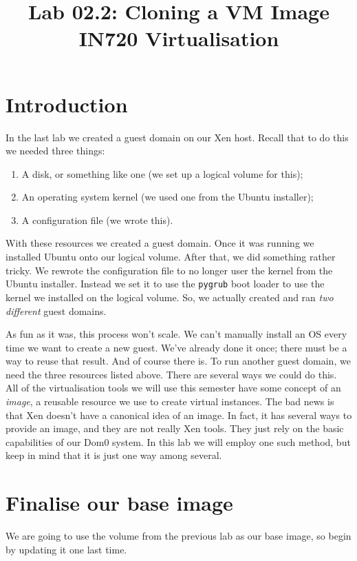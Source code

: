 \documentclass{article}
\begin{document}
\title{Lab 02.2: Cloning a VM Image\\ IN720 Virtualisation}
\date{}
\maketitle

\section*{Introduction}
In the last lab we created a guest domain on our Xen host. Recall that to do this we needed three things:

\begin{enumerate}
  \item A disk, or something like one (we set up a logical volume for this);
  \item An operating system kernel (we used one from the Ubuntu installer);
  \item A configuration file (we wrote this).
\end{enumerate}

With these resources we created a guest domain. Once it was running we installed Ubuntu onto our logical volume. After that, we did something 
rather tricky. We rewrote the configuration file to no longer user the kernel from the Ubuntu installer. Instead we set it to use the \texttt{pygrub}
boot loader to use the kernel we installed on the logical volume. So, we actually created and ran \emph{two different} guest domains.

As fun as it was, this process won't scale. We can't manually install an OS every time we want to create a new guest. We've already done it once; there
must be a way to reuse that result. And of course there is. To run another guest domain, we need the three resources listed above. There are several ways we could do this. All of the virtualisation tools we will use this semester have some concept of an \emph{image}, a reusable resource we use to create virtual instances. The bad news is that Xen doesn't have a canonical idea of an image. In fact, it has several ways to provide an image, and they are not really Xen tools. They just rely on the basic capabilities of our Dom0 system. In this lab we will employ one such method, but keep in mind that it is just one way among several.

\section{Finalise our base image}
We are going to use the volume from the previous lab as our base image, so begin by updating it one last time.
\end{document}
